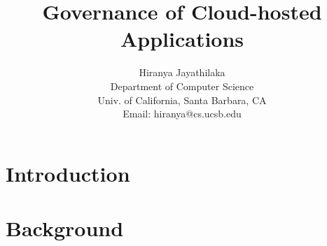 \documentclass[12pt]{article}
\begin{document}
\date{}

\title{Governance of Cloud-hosted Applications}

\author{Hiranya Jayathilaka\\
Department of Computer Science\\
Univ. of California, Santa Barbara, CA\\
Email: hiranya@cs.ucsb.edu
}
\maketitle

\section{Introduction}


\section{Background}

\end{document}
